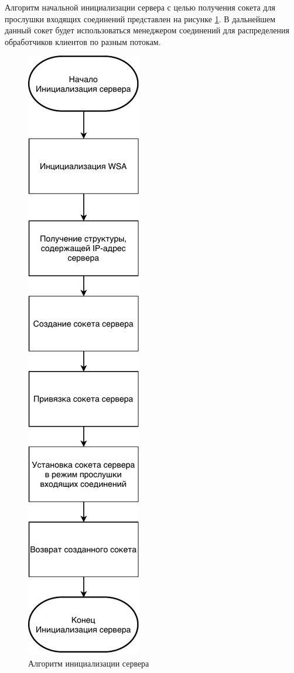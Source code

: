 Алгоритм начальной инициализации сервера с целью получения сокета для прослушки входящих соединений представлен на рисунке \ref*{sec:development:algos:initserver}. В дальнейшем данный сокет будет использоваться менеджером соединений для распределения обработчиков клиентов по разным потокам.

\begin{figure}[hb]
	\centering
	  \includegraphics[scale=1]{attachments/InitServer.pdf}  
	  \caption{ Алгоритм инициализации сервера }
	  \label{sec:development:algos:initserver}
\end{figure}

